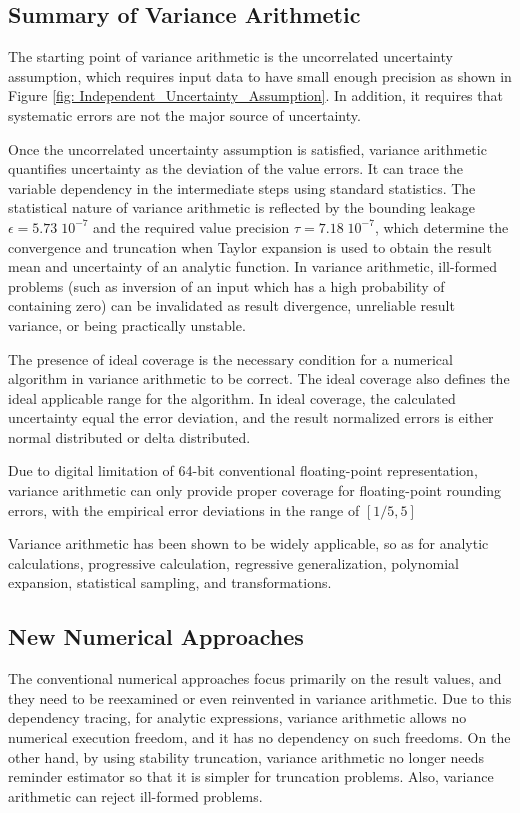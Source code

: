 \documentclass[twoside]{article}
\numberwithin{equation}{section}
\begin{document}
\subsection{Summary of Variance Arithmetic}

The starting point of variance arithmetic is the uncorrelated uncertainty assumption, which requires input data to have small enough precision as shown in Figure \ref{fig: Independent_Uncertainty_Assumption}.  
In addition, it requires that systematic errors are not the major source of uncertainty.

Once the uncorrelated uncertainty assumption is satisfied, variance arithmetic quantifies uncertainty as the deviation of the value errors.
It can trace the variable dependency in the intermediate steps using standard statistics.
The statistical nature of variance arithmetic is reflected by the bounding leakage $\epsilon=5.73 \;10^{-7}$ and the required value precision $\tau=7.18 \;10^{-7}$, which determine the convergence and truncation when Taylor expansion is used to obtain the result mean and uncertainty of an analytic function.
In variance arithmetic, ill-formed problems (such as inversion of an input which has a high probability of containing zero) can be invalidated as result divergence, unreliable result variance, or being practically unstable.

The presence of ideal coverage is the necessary condition for a numerical algorithm in variance arithmetic to be correct. 
The ideal coverage also defines the ideal applicable range for the algorithm. 
In ideal coverage, the calculated uncertainty equal the error deviation, and the result normalized errors is either normal distributed or delta distributed.

Due to digital limitation of 64-bit conventional floating-point representation, variance arithmetic can only provide proper coverage for floating-point rounding errors, with the empirical error deviations in the range of $[1/5, 5]$

Variance arithmetic has been shown to be widely applicable, so as for analytic calculations, progressive calculation, regressive generalization, polynomial expansion, statistical sampling, and transformations.



\subsection{New Numerical Approaches}

The conventional numerical approaches focus primarily on the result values, and they need to be reexamined or even reinvented in variance arithmetic.
Due to this dependency tracing, for analytic expressions, variance arithmetic allows no numerical execution freedom, and it has no dependency on such freedoms.
On the other hand, by using stability truncation, variance arithmetic no longer needs reminder estimator so that it is simpler for truncation problems.
Also, variance arithmetic can reject ill-formed problems.
\end{document}
